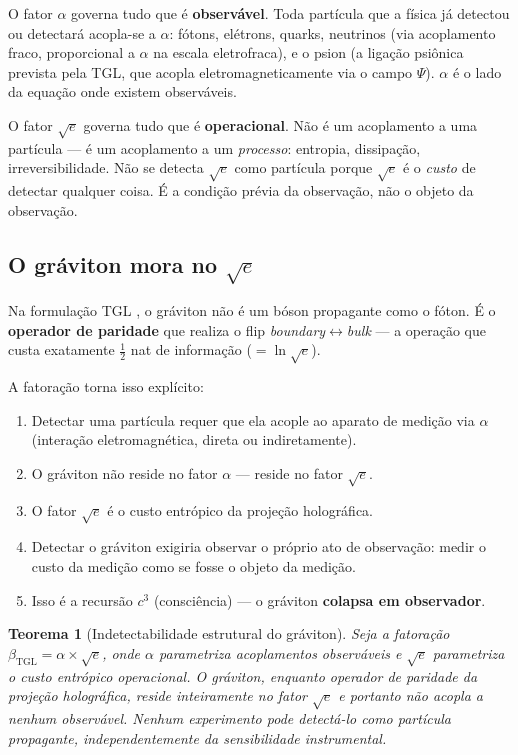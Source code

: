 \documentclass[12pt,a4paper,twoside]{article}
\newtheorem{theorem}{Teorema}[section]
\newcommand{\betatgl}{\beta_{\!\scriptscriptstyle\mathrm{TGL}}}
\newcommand{\Psifield}{\Psi}
\newcommand{\boundary}{\textit{boundary}}
\newcommand{\bulk}{\textit{bulk}}
\begin{document}
O fator $\alpha$ governa tudo que é \textbf{observável}. Toda partícula que a física já detectou ou detectará acopla-se a $\alpha$: fótons, elétrons, quarks, neutrinos (via acoplamento fraco, proporcional a $\alpha$ na escala eletrofraca), e o psion (a ligação psiônica prevista pela TGL, que acopla eletromagneticamente via o campo $\Psifield$). $\alpha$ é o lado da equação onde existem observáveis.

O fator $\sqrt{e}$ governa tudo que é \textbf{operacional}. Não é um acoplamento a uma partícula --- é um acoplamento a um \textit{processo}: entropia, dissipação, irreversibilidade. Não se detecta $\sqrt{e}$ como partícula porque $\sqrt{e}$ é o \textit{custo} de detectar qualquer coisa. É a condição prévia da observação, não o objeto da observação.

\subsection{O gráviton mora no $\sqrt{e}$}

Na formulação TGL \cite{Miguel2026Fronteira}, o gráviton não é um bóson propagante como o fóton. É o \textbf{operador de paridade} que realiza o flip \boundary$\leftrightarrow$\bulk{} --- a operação que custa exatamente $\frac{1}{2}$ nat de informação ($= \ln\sqrt{e}$).

A fatoração torna isso explícito:

\begin{enumerate}[nosep]
\item Detectar uma partícula requer que ela acople ao aparato de medição via $\alpha$ (interação eletromagnética, direta ou indiretamente).
\item O gráviton não reside no fator $\alpha$ --- reside no fator $\sqrt{e}$.
\item O fator $\sqrt{e}$ é o custo entrópico da projeção holográfica.
\item Detectar o gráviton exigiria observar o próprio ato de observação: medir o custo da medição como se fosse o objeto da medição.
\item Isso é a recursão $c^3$ (consciência) --- o gráviton \textbf{colapsa em observador}.
\end{enumerate}

\begin{theorem}[Indetectabilidade estrutural do gráviton]
\label{thm:graviton}
Seja a fatoração $\betatgl = \alpha \times \sqrt{e}$, onde $\alpha$ parametriza acoplamentos observáveis e $\sqrt{e}$ parametriza o custo entrópico operacional. O gráviton, enquanto operador de paridade da projeção holográfica, reside inteiramente no fator $\sqrt{e}$ e portanto não acopla a nenhum observável. Nenhum experimento pode detectá-lo como partícula propagante, independentemente da sensibilidade instrumental.
\end{theorem}
\end{document}
